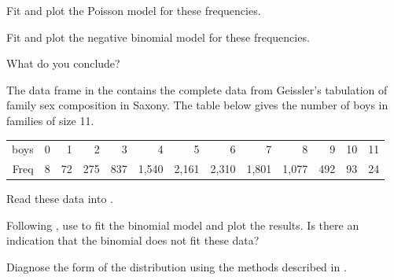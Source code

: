 \documentclass[11pt]{report}\usepackage[]{graphicx}\usepackage[]{color}
\begin{document}
\begin{Exercises}
\begin{enumerate*}
    \item Fit and plot the Poisson model for these frequencies.\begin{ans}
    \end{ans}
    
    \item Fit and plot the negative binomial model for these frequencies.\begin{ans}
    \end{ans}
    
    \item What do you conclude?\begin{ans}
    \end{ans}
    
  \end{enumerate*}

  \exercise The data frame  in the  contains the complete data from Geissler's \citeyearpar{Geissler:1889} tabulation of family sex composition in Saxony.  The table below gives the number of boys in families of size 11.

\begin{tabular}{r|rrrrrrrrrrrr}
  \hline
boys &   0 &   1 &   2 &   3 &   4 &   5 &   6 &   7 &   8 &   9 &  10 &  11 \\
  Freq &   8 &  72 & 275 & 837 & 1,540 & 2,161 & 2,310 & 1,801 & 1,077 & 492 &  93 &  24 \\
   \hline
\end{tabular}

  \begin{enumerate*}
    \item Read these data into \R.
    \item Following , use  to fit the binomial model and plot the
    results.  Is there an indication that the binomial does not fit these data?
    \begin{ans}
    \end{ans}
    
    \item Diagnose the form of the distribution using the methods described in .
    \begin{ans}
    \end{ans}
    

\end{enumerate*}
\end{Exercises}
\end{document}
